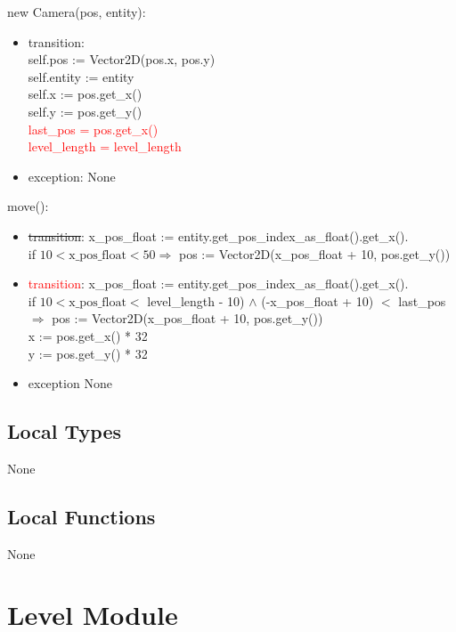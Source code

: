 \documentclass[12pt]{article}
\begin{document}
new Camera(pos, entity):
\begin{itemize}
    \item transition: \\self.pos := Vector2D(pos.x, pos.y)\\
                      self.entity := entity\\
                      self.x := pos.get\_x()\\
                      self.y := pos.get\_y()\\
                      \textcolor{red}{last\_pos = pos.get\_x()}\\
                        \textcolor{red}{level\_length = level\_length}\\
    \item exception: None
\end{itemize}

move():

\begin{itemize}
\item \st{transition}: x\_pos\_float := entity.get\_pos\_index\_as\_float().get\_x().\\ 
    if $10 < \text{x\_pos\_float} < 50 \Rightarrow$ pos := Vector2D(x\_pos\_float + 10, pos.get\_y())\\
    \item \textcolor{red}{transition}: x\_pos\_float := entity.get\_pos\_index\_as\_float().get\_x().\\ 
    if $10 < \text{x\_pos\_float} <$ level\_length - 10) $\land$ (-x\_pos\_float + 10) $<$ last\_pos $\Rightarrow$ pos := Vector2D(x\_pos\_float + 10, pos.get\_y())\\
    x := pos.get\_x() * 32\\
    y := pos.get\_y() * 32
    \item exception None
\end{itemize}


\subsection* {Local Types}

None

\subsection* {Local Functions}

None

\newpage

\section*{Level Module}
\end{document}

